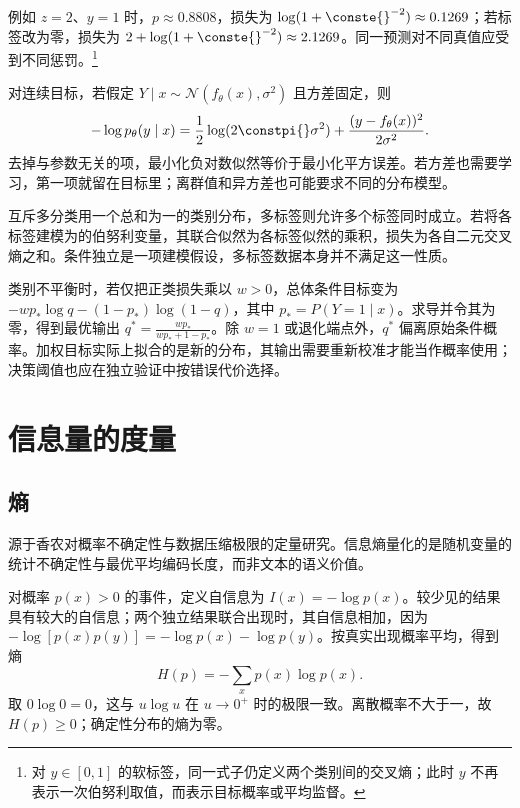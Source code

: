 \documentclass[../textbook.tex]{subfiles}
\begin{document}
例如 $z=2$、$y=1$ 时，$p\approx0.8808$，损失为 $\log(1+\conste{}^{-2})\approx0.1269$；若标签改为零，损失为 $2+\log(1+\conste{}^{-2})\approx2.1269$。同一预测对不同真值应受到不同惩罚。\footnote{对 $y\in[0,1]$ 的软标签，同一式子仍定义两个类别间的交叉熵；此时 $y$ 不再表示一次伯努利取值，而表示目标概率或平均监督。}

对连续目标，若假定 $Y\mid x\sim\mathcal N(f_\theta(x),\sigma^2)$ 且方差固定，则
\begin{equation}
 -\log p_\theta(y\mid x)=\frac12\log(2\constpi{}\sigma^2)
 +\frac{(y-f_\theta(x))^2}{2\sigma^2}.
\end{equation}
去掉与参数无关的项，最小化负对数似然等价于最小化平方误差。若方差也需要学习，第一项就留在目标里；离群值和异方差也可能要求不同的分布模型。

互斥多分类用一个总和为一的类别分布，多标签则允许多个标签同时成立。若将各标签建模为的伯努利变量，其联合似然为各标签似然的乘积，损失为各自二元交叉熵之和。条件独立是一项建模假设，多标签数据本身并不满足这一性质。

类别不平衡时，若仅把正类损失乘以 $w>0$，总体条件目标变为 $-wp_*\log q-(1-p_*)\log(1-q)$，其中 $p_*=P(Y=1\mid x)$。求导并令其为零，得到最优输出 $q^*=\frac{wp_*}{wp_*+1-p_*}$。除 $w=1$ 或退化端点外，$q^*$ 偏离原始条件概率。加权目标实际上拟合的是新的分布，其输出需要重新校准才能当作概率使用；决策阈值也应在独立验证中按错误代价选择。

\section{信息量的度量}

\subsection{熵}
源于香农对概率不确定性与数据压缩极限的定量研究\cite{shannon1948communication}。信息熵量化的是随机变量的统计不确定性与最优平均编码长度，而非文本的语义价值。

对概率 $p(x)>0$ 的事件，定义自信息为 $I(x)=-\log p(x)$。较少见的结果具有较大的自信息；两个独立结果联合出现时，其自信息相加，因为 $-\log[p(x)p(y)]=-\log p(x)-\log p(y)$。按真实出现概率平均，得到熵
\begin{equation}
 H(p)=-\sum_xp(x)\log p(x).
\end{equation}
取 $0\log0=0$，这与 $u\log u$ 在 $u\to0^+$ 时的极限一致。离散概率不大于一，故 $H(p)\ge0$；确定性分布的熵为零。
\end{document}
